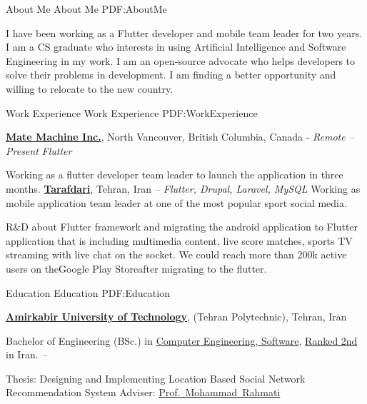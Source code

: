 \documentclass[letterpaper,MMMyyyy,nonstopmode]{resume}
\begin{document}
\begin{Body}



\Section
{About Me}
{About Me}
{PDF:AboutMe}

I have been working as a Flutter developer and mobile team leader for two years.
I am a CS graduate who interests in using Artificial Intelligence and Software Engineering in my work.
I am an open-source advocate who helps developers to solve their problems in development.
I am finding a better opportunity and willing to relocate to the new country.


\Section
{Work\newline
Experience}
{Work Experience}
{PDF:WorkExperience}

\Entry
\href{https://matemachine.com}
{\textbf{Mate Machine Inc.}},
\small{North Vancouver, British Columbia, Canada - }\textit{\small{Remote}}
\hfill
\textsl{\small{ -- Present}}
\Gap
\small{\textit{Flutter}}

\BulletItem
Working as a flutter developer team leader to launch the application in three months.
\BigGap
\Entry
\href{https://tarafdari.com}
{\textbf{Tarafdari}},
\small{Tehran, Iran}
\hfill
\textsl{\small{ -- }}
\Gap
\small{\textit{Flutter, Drupal, Laravel, MySQL}}
\BulletItem
Working as mobile application team leader at one of the most popular sport social media.
\hfill
\normalsize{
\href{https://play.google.com/store/apps/details?id=com.tarafdari.news}
{\faAndroid}}
\begin{Detail}
\SubBulletItem
R\&D about Flutter framework and migrating the android application to Flutter
application that is including multimedia content,
live score matches, sports TV streaming with live chat on the socket.
\SubBulletItem
We could reach more than 200k active users on theGoogle Play Storeafter migrating to the flutter.
\end{Detail}


\Section
{Education}
{Education}
{PDF:Education}

\Entry
\href{https://aut.ac.ir}
{\textbf{Amirkabir University of Technology}},
\small{(Tehran Polytechnic), Tehran, Iran}

\Gap
\BulletItem
Bachelor of Engineering (BSc.) in
\href{https://ce.aut.ac.ir/en}
{Computer Engineering, Software},
\href{https://ur.isc.gov.ir/#Technology}
{Ranked 2nd}
in Iran.
\hfill
\textsl{\small{ -- }}
\begin{Detail}
\SubBulletItem
Thesis:
Designing and Implementing Location Based Social Network
Recommendation System
\SubBulletItem
Adviser:
\href{https://aut.ac.ir/cv/2416/Mohammad-Rahmati?slc_lang=en&&cv=2416&mod=scv}
{Prof.~Mohammad~Rahmati}
\end{Detail}


\end{Body}
\end{document}
